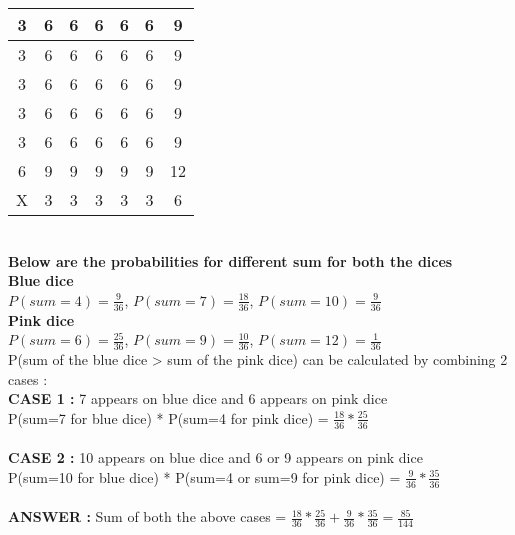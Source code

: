 \documentclass[14pt, letterpaper]{article}
\begin{document}
\quad
    \begin{tabular}{|c|c|c|c|c|c|c|}
        \hline
        \cellcolor[HTML]{F4BBFF}3 & 6 & 6 & 6 & 6 & 6 & 9\\
        \hline
        \cellcolor[HTML]{F4BBFF}3 & 6 & 6 & 6 & 6 & 6 & 9\\    
        \hline
        \cellcolor[HTML]{F4BBFF}3 & 6 & 6 & 6 & 6 & 6 & 9\\ 
        \hline
        \cellcolor[HTML]{F4BBFF}3 & 6 & 6 & 6 & 6 & 6 & 9\\
        \hline
        \cellcolor[HTML]{F4BBFF}3 & 6 & 6 & 6 & 6 & 6 & 9\\
        \hline
        \cellcolor[HTML]{F4BBFF}6 & 9 & 9 & 9 & 9 & 9 & 12\\
        \hline
        \rowcolor[HTML]{F4BBFF} X & 3 & 3 & 3 & 3 & 3 & 6\\
        \hline
    \end{tabular} \\[+0.2cm]
\textbf{Below are the probabilities for different sum for both the dices}\\
\textbf{Blue dice}\\
$P(sum = 4)=\frac{9}{36}$,  $P(sum = 7)=\frac{18}{36}$,  $P(sum = 10)=\frac{9}{36}$ \\[+0.2cm]
\textbf{Pink dice}\\
$P(sum = 6)=\frac{25}{36}$, $P(sum = 9)=\frac{10}{36}$, $P(sum = 12)=\frac{1}{36}$ \\[+0.2cm]
P(sum of the blue dice > sum of the pink dice) can be calculated by combining 2 cases : \\
\textbf{CASE 1 : } 7 appears on blue dice and 6 appears on pink dice  \\
P(sum=7 for blue dice) * P(sum=4 for pink dice) = $\frac{18}{36} * \frac{25}{36}$ \\ \\

\textbf{CASE 2 : } 10 appears on blue dice and 6 or 9 appears on pink dice  \\
P(sum=10 for blue dice) * P(sum=4 or sum=9 for pink dice) = $\frac{9}{36} * \frac{35}{36}$ \\ \\

\textbf{ANSWER : }Sum of both the above cases = $\frac{18}{36} * \frac{25}{36} + \frac{9}{36} * \frac{35}{36} = \frac{85}{144}$
\end{document}

